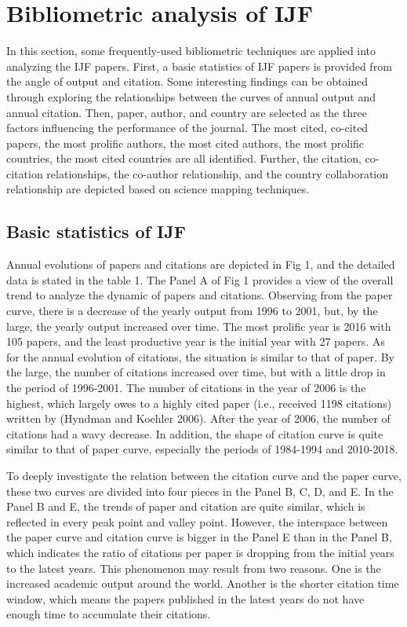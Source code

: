 \documentclass[11pt,a4paper]{elsarticle} %
\begin{document}
\section{Bibliometric analysis of
IJF}\label{bibliometric-analysis-of-ijf}

In this section, some frequently-used bibliometric techniques are
applied into analyzing the IJF papers. First, a basic statistics of IJF
papers is provided from the angle of output and citation. Some
interesting findings can be obtained through exploring the relationships
between the curves of annual output and annual citation. Then, paper,
author, and country are selected as the three factors influencing the
performance of the journal. The most cited, co-cited papers, the most
prolific authors, the most cited authors, the most prolific countries,
the most cited countries are all identified. Further, the citation,
co-citation relationships, the co-author relationship, and the country
collaboration relationship are depicted based on science mapping
techniques.

\subsection{Basic statistics of IJF}\label{basic-statistics-of-ijf}

Annual evolutions of papers and citations are depicted in Fig 1, and the
detailed data is stated in the table 1. The Panel A of Fig 1 provides a
view of the overall trend to analyze the dynamic of papers and
citations. Observing from the paper curve, there is a decrease of the
yearly output from 1996 to 2001, but, by the large, the yearly output
increased over time. The most prolific year is 2016 with 105 papers, and
the least productive year is the initial year with 27 papers. As for the
annual evolution of citations, the situation is similar to that of
paper. By the large, the number of citations increased over time, but
with a little drop in the period of 1996-2001. The number of citations
in the year of 2006 is the highest, which largely owes to a highly cited
paper (i.e., received 1198 citations) written by (Hyndman and Koehler
2006). After the year of 2006, the number of citations had a wavy
decrease. In addition, the shape of citation curve is quite similar to
that of paper curve, especially the periods of 1984-1994 and 2010-2018.

To deeply investigate the relation between the citation curve and the
paper curve, these two curves are divided into four pieces in the Panel
B, C, D, and E. In the Panel B and E, the trends of paper and citation
are quite similar, which is reflected in every peak point and valley
point. However, the interspace between the paper curve and citation
curve is bigger in the Panel E than in the Panel B, which indicates the
ratio of citations per paper is dropping from the initial years to the
latest years. This phenomenon may result from two reasons. One is the
increased academic output around the world. Another is the shorter
citation time window, which means the papers published in the latest
years do not have enough time to accumulate their citations.
\end{document}
